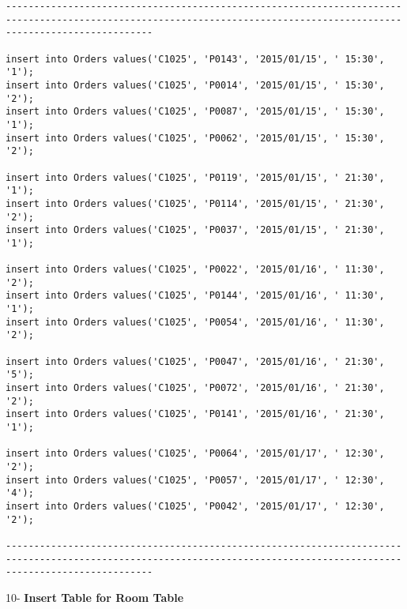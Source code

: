 \documentclass[a4,12pt]{report}
\begin{document}
\begin{lstlisting}
----------------------------------------------------------------------------------------------------------------------------------------------------------------------

insert into Orders values('C1025', 'P0143', '2015/01/15', ' 15:30', '1');
insert into Orders values('C1025', 'P0014', '2015/01/15', ' 15:30', '2');
insert into Orders values('C1025', 'P0087', '2015/01/15', ' 15:30', '1');
insert into Orders values('C1025', 'P0062', '2015/01/15', ' 15:30', '2');

insert into Orders values('C1025', 'P0119', '2015/01/15', ' 21:30', '1');
insert into Orders values('C1025', 'P0114', '2015/01/15', ' 21:30', '2');
insert into Orders values('C1025', 'P0037', '2015/01/15', ' 21:30', '1');

insert into Orders values('C1025', 'P0022', '2015/01/16', ' 11:30', '2');
insert into Orders values('C1025', 'P0144', '2015/01/16', ' 11:30', '1');
insert into Orders values('C1025', 'P0054', '2015/01/16', ' 11:30', '2');

insert into Orders values('C1025', 'P0047', '2015/01/16', ' 21:30', '5');
insert into Orders values('C1025', 'P0072', '2015/01/16', ' 21:30', '2');
insert into Orders values('C1025', 'P0141', '2015/01/16', ' 21:30', '1');

insert into Orders values('C1025', 'P0064', '2015/01/17', ' 12:30', '2');
insert into Orders values('C1025', 'P0057', '2015/01/17', ' 12:30', '4');
insert into Orders values('C1025', 'P0042', '2015/01/17', ' 12:30', '2');

----------------------------------------------------------------------------------------------------------------------------------------------------------------------

\end{lstlisting}

\begin{flushleft}
 10- \textbf{ Insert Table for Room Table}
\end{flushleft}
\end{document}
